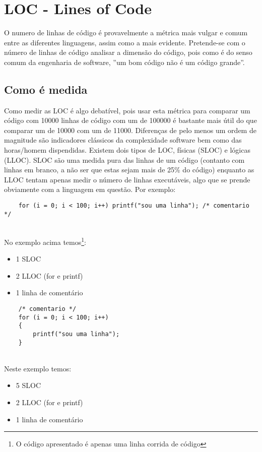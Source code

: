 \documentclass[a4paper,10pt,openright,openbib,twocolumn]{article}
\begin{document}
\section{LOC - Lines of Code}

O numero de linhas de código é provavelmente a métrica mais vulgar e comum entre as diferentes linguagens, assim como a mais evidente. Pretende-se com o número de linhas de código analisar a dimensão do código, pois como é do senso comum da engenharia de software, ”um bom código não  é um código grande”.

\subsection{Como é medida}

Como medir as LOC é algo debatível, pois usar esta métrica para comparar um código com 10000 linhas de código com um de 100000 é bastante mais útil do que comparar um de 10000 com um de 11000. Diferenças de pelo menos um ordem de magnitude são indicadores clássicos da complexidade software bem como das horas/homem dispendidas. Existem dois tipos de LOC, físicas (SLOC) e lógicas (LLOC). SLOC são uma medida pura das linhas de um código (contanto com linhas em branco, a não ser que estas sejam mais de 25\% do código) enquanto as LLOC tentam apenas medir o número de linhas executáveis, algo que se prende obviamente com a linguagem em questão. Por exemplo:

\begin{minipage}{.47\textwidth}
\lstset{
    language=C,
    basicstyle=\ttfamily\small,
    breaklines=true
}
\begin{lstlisting}
    for (i = 0; i < 100; i++) printf("sou uma linha"); /* comentario */
\end{lstlisting}
\end{minipage}
\\No exemplo acima temos\footnote{O código apresentado é apenas uma linha corrida de código}:
\begin{itemize}
	\item 1 SLOC
	\item 2 LLOC (for e printf)
	\item 1 linha de comentário
\end{itemize}



\begin{minipage}{.47\textwidth}
\lstset{
    language=C,
    basicstyle=\ttfamily\small,
    breaklines=true
}
\begin{lstlisting}
	/* comentario */
    for (i = 0; i < 100; i++) 
    {
    	printf("sou uma linha"); 
    }    
\end{lstlisting}
\end{minipage}
\\Neste exemplo temos:
\begin{itemize}
	\item 5 SLOC 
	\item 2 LLOC (for e printf)
	\item 1 linha de comentário
\end{itemize}
\end{document}
